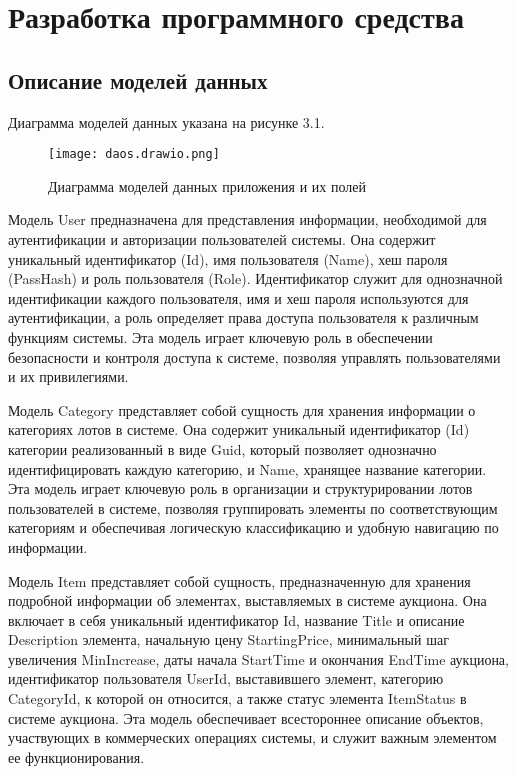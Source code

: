 \section{Разработка программного средства}

\subsection{Описание моделей данных}

Диаграмма моделей данных указана на рисунке 3.1.

\begin{figure}[h]
\centering
\texttt{[image: daos.drawio.png]}
\caption{Диаграмма моделей данных приложения и их полей}
\end{figure}

Модель User предназначена для представления информации, необходимой для аутентификации и авторизации пользователей системы. 
Она содержит уникальный идентификатор (Id), имя пользователя (Name), хеш пароля (PassHash) и роль пользователя (Role). 
Идентификатор служит для однозначной идентификации каждого пользователя, имя и хеш пароля используются для аутентификации, 
а роль определяет права доступа пользователя к различным функциям системы. 
Эта модель играет ключевую роль в обеспечении безопасности и контроля доступа к системе, 
позволяя управлять пользователями и их привилегиями.

Модель Category представляет собой сущность для хранения информации о категориях лотов в системе. 
Она содержит уникальный идентификатор (Id) категории реализованный в виде Guid, 
который позволяет однозначно идентифицировать каждую категорию, 
и Name, хранящее название категории. 
Эта модель играет ключевую роль в организации и структурировании лотов пользователей в системе, 
позволяя группировать элементы по соответствующим категориям и 
обеспечивая логическую классификацию и удобную навигацию по информации.

Модель Item представляет собой сущность, предназначенную для хранения подробной информации об элементах, 
выставляемых в системе аукциона. 
Она включает в себя уникальный идентификатор Id, 
название Title и описание Description элемента, 
начальную цену StartingPrice, минимальный шаг увеличения MinIncrease, 
даты начала StartTime и окончания EndTime аукциона, 
идентификатор пользователя UserId, выставившего элемент, 
категорию CategoryId, к которой он относится, 
а также статус элемента ItemStatus в системе аукциона. 
Эта модель обеспечивает всестороннее описание объектов, 
участвующих в коммерческих операциях системы, и служит важным элементом ее функционирования.

